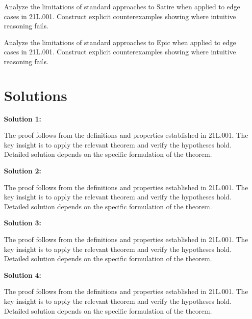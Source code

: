 \documentclass[12pt,a4paper]{exam}
\begin{document}
\begin{questions}
\vspace{0.3cm}

\question[4]
Analyze the limitations of standard approaches to Satire when applied to edge cases in 21L.001. Construct explicit counterexamples showing where intuitive reasoning fails.

\vspace{0.3cm}

\question[6]
Analyze the limitations of standard approaches to Epic when applied to edge cases in 21L.001. Construct explicit counterexamples showing where intuitive reasoning fails.

\vspace{0.3cm}

\end{questions}

\newpage
\section*{Solutions}

\textbf{Solution 1:}

The proof follows from the definitions and properties established in 21L.001. The key insight is to apply the relevant theorem and verify the hypotheses hold. Detailed solution depends on the specific formulation of the theorem.

\vspace{0.5cm}

\textbf{Solution 2:}

The proof follows from the definitions and properties established in 21L.001. The key insight is to apply the relevant theorem and verify the hypotheses hold. Detailed solution depends on the specific formulation of the theorem.

\vspace{0.5cm}

\textbf{Solution 3:}

The proof follows from the definitions and properties established in 21L.001. The key insight is to apply the relevant theorem and verify the hypotheses hold. Detailed solution depends on the specific formulation of the theorem.

\vspace{0.5cm}

\textbf{Solution 4:}

The proof follows from the definitions and properties established in 21L.001. The key insight is to apply the relevant theorem and verify the hypotheses hold. Detailed solution depends on the specific formulation of the theorem.
\end{document}
